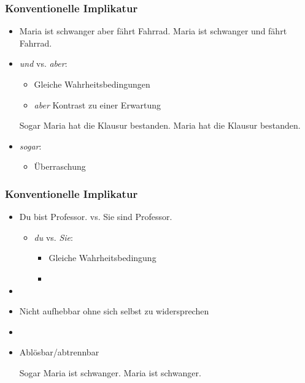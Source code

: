 
\begin{frame}
\frametitle{Konventionelle Implikatur}

\begin{itemize}
	\item[]

	\eal 
	\ex Maria ist schwanger aber fährt Fahrrad.
	\ex Maria ist schwanger und fährt Fahrrad.
	\zl
	
	\item \textit{und} vs. \textit{aber}:
		
	\begin{itemize}
		\item Gleiche Wahrheitsbedingungen
		\item \textit{aber} \ras Kontrast zu einer Erwartung
	\end{itemize}

\vspace{5mm}

	\eal 
	\ex Sogar Maria hat die Klausur bestanden.	
	\ex Maria hat die Klausur bestanden.
	\zl

	\item \textit{sogar}:
		
	\begin{itemize}
		\item Überraschung
	\end{itemize}
		
\end{itemize}

\end{frame}



\begin{frame}
\frametitle{Konventionelle Implikatur}

\begin{itemize}
	\item Du bist Professor. vs. Sie sind Professor.
	
	\begin{itemize}
		\item \textit{du} vs. \textit{Sie}:
		
		\begin{itemize}
			\item Gleiche Wahrheitsbedingung
			\item {}
		\end{itemize}
		
	\end{itemize}
	
	\item[]
	\item Nicht aufhebbar \ras ohne sich selbst zu widersprechen
	\item[]
	\item Ablösbar/abtrennbar
	
	\eal
	\ex Sogar Maria ist schwanger.
	\ex Maria ist schwanger.
	\zl
	
	\end{itemize}

\end{frame}


